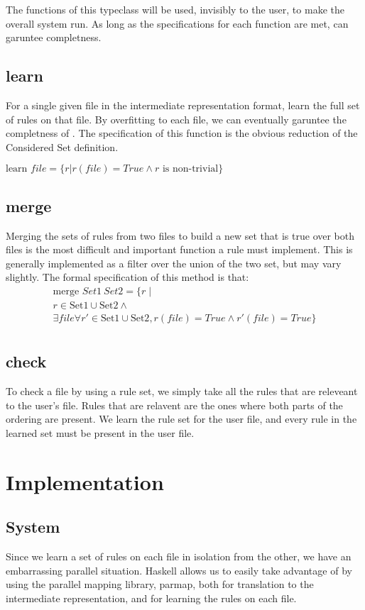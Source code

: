 The functions of this typeclass will be used, invisibly to the user, to make the overall system run.
As long as the specifications for each function are met, \app can garuntee completness.

\subsection{learn}
  For a single given file in the intermediate representation format, learn the full set of rules on that file.
  By overfitting to each file, we can eventually garuntee the completness of \app.
  The specification of this function is the obvious reduction of the Considered Set definition.

  $\text{learn } file =  \{ r | r(file) = True \land r \text{ is non-trivial}\}$

\subsection{merge}
  Merging the sets of rules from two files to build a new set that is true over both files is the most difficult and important function a rule must implement.
  This is generally implemented as a filter over the union of the two set, but may vary slightly.
  The formal specification of this method is that:
  \begin{multline*}
  \text{merge } Set1 \: Set2= \{r \mid \\
    r \in \text{Set1} \cup \text{Set2} \land \\
    \exists file \forall r' \in \text{Set1} \cup \text{Set2}, r(file) = True \land r'(file) = True \} \\
  \end{multline*}

\subsection{check}
  To check a file by using a rule set, we simply take all the rules that are releveant to the user's file.
  Rules that are relavent are the ones where both parts of the ordering are present.
  We learn the rule set for the user file, and every rule in the learned set must be present in the user file.

\section{Implementation}

\subsection{System}
Since we learn a set of rules on each file in isolation from the other, we have an embarrassing parallel situation.
Haskell allows us to easily take advantage of by using the parallel mapping library, parmap, both for translation to the intermediate representation, and for learning the rules on each file.

